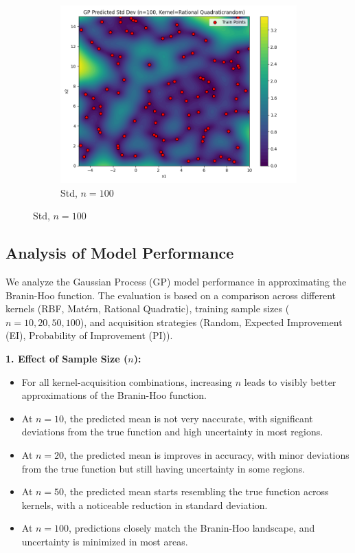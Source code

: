 \documentclass[a4paper,12pt]{article}
\begin{document}
\begin{figure}[H]
\begin{subfigure}{0.3\textwidth}
    \includegraphics[width=\linewidth]{Task-02/images/gp_std_rational_quadratic_n100_random.png}
    \caption{Std, $n=100$}
\end{subfigure} 
\end{figure}

\subsection*{Analysis of Model Performance}

We analyze the Gaussian Process (GP) model performance in approximating the Branin-Hoo function. The evaluation is based on a comparison across different kernels (RBF, Matérn, Rational Quadratic), training sample sizes ($n = 10, 20, 50, 100$), and acquisition strategies (Random, Expected Improvement (EI), Probability of Improvement (PI)).

\textbf{1. Effect of Sample Size ($n$):}
\begin{itemize}
    \item For all kernel-acquisition combinations, increasing $n$ leads to visibly better approximations of the Branin-Hoo function.
    \item At $n = 10$, the predicted mean is not very naccurate, with significant deviations from the true function and high uncertainty in most regions.
    \item At $n = 20$, the predicted mean is improves in accuracy, with minor deviations from the true function but still having uncertainty in some regions.
    \item At $n = 50$, the predicted mean starts resembling the true function across kernels, with a noticeable reduction in standard deviation.
    \item At $n = 100$, predictions closely match the Branin-Hoo landscape, and uncertainty is minimized in most areas.
\end{itemize}
\end{document}
